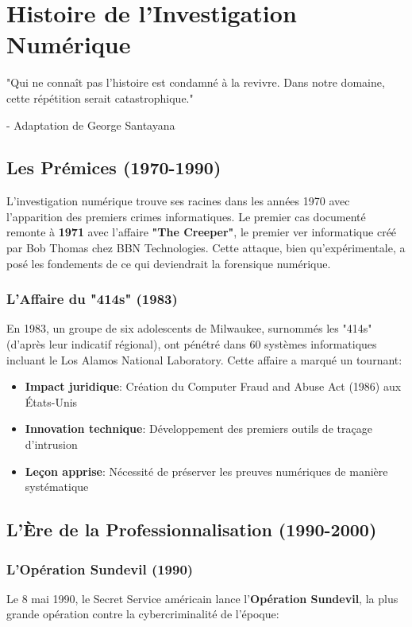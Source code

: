 \chapter{Histoire de l'Investigation Numérique}
\epigraph{"Qui ne connaît pas l'histoire est condamné à la revivre. Dans notre domaine, cette répétition serait catastrophique."}{- Adaptation de George Santayana}
\section{Les Prémices (1970-1990)}
L'investigation numérique trouve ses racines dans les années 1970 avec l'apparition des premiers crimes informatiques. Le premier cas documenté remonte à \textbf{1971} avec l'affaire \textbf{"The Creeper"}, le premier ver informatique créé par Bob Thomas chez BBN Technologies. Cette attaque, bien qu'expérimentale, a posé les fondements de ce qui deviendrait la forensique numérique.

\subsection{L'Affaire du "414s" (1983)}
En 1983, un groupe de six adolescents de Milwaukee, surnommés les "414s" (d'après leur indicatif régional), ont pénétré dans 60 systèmes informatiques incluant le Los Alamos National Laboratory. Cette affaire a marqué un tournant:

\begin{itemize}
\item \textbf{Impact juridique}: Création du Computer Fraud and Abuse Act (1986) aux États-Unis
\item \textbf{Innovation technique}: Développement des premiers outils de traçage d'intrusion
\item \textbf{Leçon apprise}: Nécessité de préserver les preuves numériques de manière systématique
\end{itemize}

\section{L'Ère de la Professionnalisation (1990-2000)}
\subsection{L'Opération Sundevil (1990)}
Le 8 mai 1990, le Secret Service américain lance l'\textbf{Opération Sundevil}, la plus grande opération contre la cybercriminalité de l'époque:

